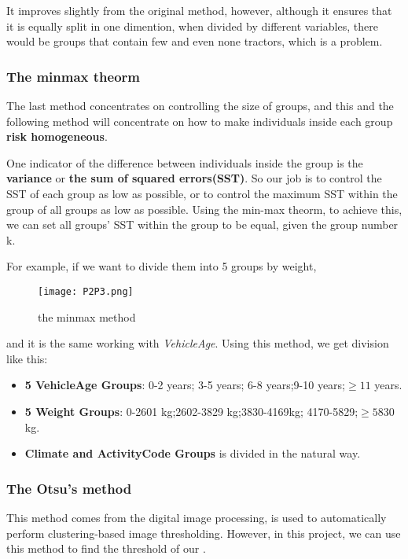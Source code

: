 \documentclass[11pt]{article}
\begin{document}
It improves slightly from the original method, however, although it ensures that it is equally split in one dimention, when divided by different variables, there would be groups that contain few and even none tractors, which is a problem.

\subsubsection{The minmax theorm}

The last method concentrates on controlling the size of groups, and this and the following method will concentrate on how to make individuals inside each group {\bf risk homogeneous}.

One indicator of the difference between individuals inside the group is the {\bf variance} or {\bf the sum of squared errors(SST)}. So our job is to control the SST of each group as low as possible, or to control the maximum SST within the group of all groups as low as possible. Using the min-max theorm, to achieve this, we can set all groups' SST within the group to be equal, given the group number k. 

For example, if we want to divide them into 5 groups by weight,


\begin{figure}[!htb]
\centering
\texttt{[image: P2P3.png]}
\caption{the minmax method}\label{Fig3}
\end{figure}

and it is the same working with {\it VehicleAge}. Using this method, we get division like this:

\begin{itemize}
	\item {\bf 5 VehicleAge Groups}: 0-2 years; 3-5 years; 6-8 years;9-10 years;$\geqslant 11$ years.
	\item {\bf 5 Weight Groups}: 0-2601 kg;2602-3829 kg;3830-4169kg; 4170-5829;$\geqslant5830$ kg.
	\item {\bf Climate and ActivityCode Groups} is divided in the natural way. 
\end{itemize}


\subsubsection{The Otsu's method}

This method comes from the digital image processing, is used to automatically perform clustering-based image thresholding. However, in this project, we can use this method to find the threshold of our .
\end{document}
